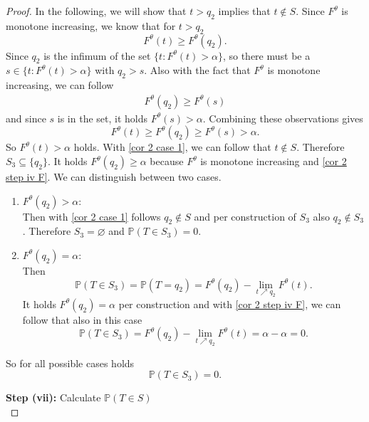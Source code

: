 \begin{proof}
	In the following, we will show that $t > q_2$ implies that $t \notin S$. Since $F^\theta$ is monotone increasing, we know that for $t > q_2$
	\begin{equation*}
		F^\theta (t) \geq F^\theta (q_2).
	\end{equation*}
	Since $q_2$ is the infimum of the set $\{t: F^\theta (t) > \alpha\}$, so there must be a $s \in \{t: F^\theta (t) > \alpha\}$ with $q_2 > s$. Also with the fact that $F^\theta$ is monotone increasing, we can follow 
	\begin{align*}
		F^\theta (q_2) \geq F^\theta (s)
	\end{align*}
	and since $s$ is in the set, it holds $F^\theta (s) > \alpha$. Combining these observations gives 
	\begin{equation*}
		F^\theta (t) \geq F^\theta (q_2) \geq F^\theta (s) > \alpha.
	\end{equation*}
	So $F^\theta (t) > \alpha$ holds.
	With \eqref{cor 2 case 1}, we can follow that $t \notin S$. 
	Therefore $S_3 \subseteq \{q_2\}$. It holds $F^\theta (q_2) \geq \alpha$ because $F^\theta$ is monotone increasing and \eqref{cor 2 step iv F}. We can distinguish between two cases.
	\begin{enumerate}
		\item 
		$F^\theta (q_2) > \alpha$: \\
		Then with \eqref{cor 2 case 1} follows $q_2 \notin S$ and per construction of $S_3$ also $q_2 \notin S_3$. Therefore $S_3 = \varnothing$ and $\mathbb{P} \left( T \in S_3 \right) = 0$.
		\item 
		$F^\theta (q_2) = \alpha$: \\
		Then 
		\begin{equation*}
			\mathbb{P} (T \in S_3) = \mathbb{P} (T = q_2)
			=
			F^\theta (q_2) - \lim_{t \nearrow q_2} F^\theta (t).
		\end{equation*}
		It holds $F^\theta (q_2) = \alpha$ per construction and with \eqref{cor 2 step iv F}, we can follow that also in this case
		\begin{equation*}
			\mathbb{P} (T \in S_3)
			=
			F^\theta (q_2) - \lim_{t \nearrow q_2} F^\theta (t)
			=
			\alpha - \alpha = 0.
		\end{equation*}
	\end{enumerate}
	So for all possible cases holds
	\begin{equation} \label{cor 2 S_3}
		\mathbb{P} (T \in S_3) = 0.
	\end{equation}
	
	\textbf{Step (vii):} Calculate $\mathbb{P} (T \in S)$ \\
	

\end{proof}
